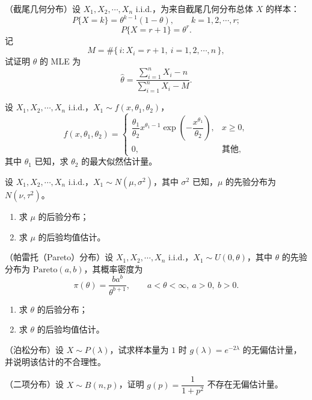 \begin{homework}[11]
（截尾几何分布）设 \(X_1,X_2,\cdots,X_n\) i.i.d.，为来自截尾几何分布总体 \(X\) 的样本：
\[
P\{X=k\}=\theta^{k-1}(1-\theta),\qquad k=1,2,\cdots,r;
\]
\[
P\{X=r+1\}=\theta^r.
\]
记
\[
M=\#\{\,i: X_i=r+1,\ i=1,2,\cdots,n\,\},
\]
试证明 \(\theta\) 的 MLE 为
\[
\hat{\theta}
=
\frac{\sum_{i=1}^n X_i-n}{\sum_{i=1}^n X_i-M}.
\]
\end{homework}

\begin{homework}[12]
设 \(X_1,X_2,\cdots,X_n\) i.i.d.，\(X_1\sim f(x,\theta_1,\theta_2)\)，
\[
f(x,\theta_1,\theta_2)=
\begin{cases}
\dfrac{\theta_1}{\theta_2}x^{\theta_1-1}\exp\!\left(-\dfrac{x^{\theta_1}}{\theta_2}\right), & x\ge 0,\\[1ex]
0, & \text{其他},
\end{cases}
\]
其中 \(\theta_1\) 已知，求 \(\theta_2\) 的最大似然估计量。
\end{homework}
\begin{homework}[18]
设 \(X_1,X_2,\cdots,X_n\) i.i.d.，\(X_1\sim N(\mu,\sigma^2)\)，其中 \(\sigma^2\) 已知，\(\mu\) 的先验分布为 \(N(\nu,\tau^2)\)。

\begin{enumerate}
    \item 求 \(\mu\) 的后验分布；
    \item 求 \(\mu\) 的后验均值估计。
\end{enumerate}
\end{homework}

\begin{homework}[20]
（帕雷托（Pareto）分布）设 \(X_1,X_2,\cdots,X_n\) i.i.d.，\(X_1\sim U(0,\theta)\)，其中 \(\theta\) 的先验分布为 \(\mathrm{Pareto}(a,b)\)，其概率密度为
\[
\pi(\theta)=\frac{ba^b}{\theta^{b+1}},\qquad a<\theta<\infty,\ a>0,\ b>0.
\]

\begin{enumerate}
    \item 求 \(\theta\) 的后验分布；
    \item 求 \(\theta\) 的后验均值估计。
\end{enumerate}
\end{homework}
\begin{homework}[1]
（泊松分布）设 $X \sim P(\lambda)$，试求样本量为 $1$ 时 $g(\lambda) = e^{-2\lambda}$ 的无偏估计量，并说明该估计的不合理性。
\end{homework}

\begin{homework}[2]
（二项分布）设 $X \sim B(n,p)$，证明 $g(p) = \dfrac{1}{1+p^2}$ 不存在无偏估计量。
\end{homework}

